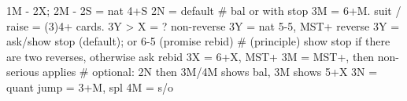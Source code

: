 1M - 2X; 2M -
2S = nat 4+S
2N = default  # bal or with stop
    3M = 6+M. suit / raise = (3)4+ cards. 3Y > X = ?
non-reverse 3Y = nat 5-5, MST+
reverse 3Y = ask/show stop (default); or 6-5 (promise rebid)
    # (principle) show stop if there are two reverses, otherwise ask
rebid 3X = 6+X, MST+
3M = MST+, then non-serious applies
    # optional: 2N then 3M/4M shows bal, 3M shows 5+X
3N = quant
jump = 3+M, spl
4M = s/o